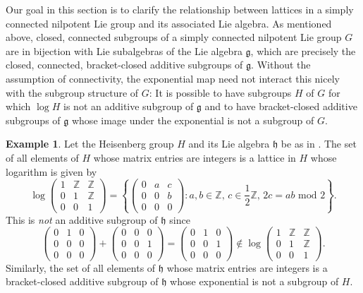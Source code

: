 \documentclass[11pt]{article}
\numberwithin{equation}{section}
\theoremstyle{plain}
\theoremstyle{definition}
\newtheorem{example}[thm]{Example}
\theoremstyle{remark}
\numberwithin{equation}{section}
\newcommand{\Z}{\mathbb Z}
\numberwithin{equation}{section}
\begin{document}
Our goal in this section is to clarify the relationship between lattices in a simply connected nilpotent Lie group and its associated Lie algebra.
As mentioned above, closed, connected subgroups of a simply connected nilpotent Lie group $G$ are in bijection with Lie subalgebras of the Lie algebra $\mathfrak{g}$, which are precisely the closed, connected, bracket-closed additive subgroups of $\mathfrak{g}$. Without the assumption of connectivity, the exponential map need not interact this nicely with the subgroup structure of $G$: It is possible to have subgroups $H$ of $G$ for which $\log H$ is not an additive subgroup of $\mathfrak{g}$ and to have bracket-closed additive subgroups of $\mathfrak{g}$ whose image under the exponential is not a subgroup of $G$. 

\begin{example}
\label{ex:heisenberg_subgroups}
Let the Heisenberg group $H$ and its Lie algebra $\mathfrak{h}$ be as in . The set of all elements of $H$ whose matrix entries are integers is a lattice in $H$ whose logarithm is given by
\[
\log \left(\begin{matrix} 1 & \Z & \Z \\ 0 & 1 & \Z \\ 0&0&1\end{matrix}\right) = \left\{ \left(\begin{matrix} 0 & a & c \\ 0 & 0 & b \\ 0&0&0\end{matrix}\right) : a,b\in \Z,\, c \in \frac{1}{2}\Z,\, 2c=ab \text{ mod } 2 \right\}.
\]
This is \emph{not} an additive subgroup of $\mathfrak{h}$ since
\[
\left(\begin{matrix} 0 & 1 & 0 \\ 0 & 0 & 0 \\ 0&0&0\end{matrix}\right) + \left(\begin{matrix} 0 & 0 & 0 \\ 0 & 0 & 1 \\ 0&0&0\end{matrix}\right) = \left(\begin{matrix} 0 & 1 & 0 \\ 0 & 0 & 1 \\ 0&0&0\end{matrix}\right) \notin \log \left(\begin{matrix} 1 & \Z & \Z \\ 0 & 1 & \Z \\ 0&0&1\end{matrix}\right).
\]
 Similarly, the set of all elements of $\mathfrak{h}$ whose matrix entries are integers is a bracket-closed additive subgroup of $\mathfrak{h}$ whose exponential is not a subgroup of $H$.
%
%
%
%
%
%
%
\end{example}
\end{document}
